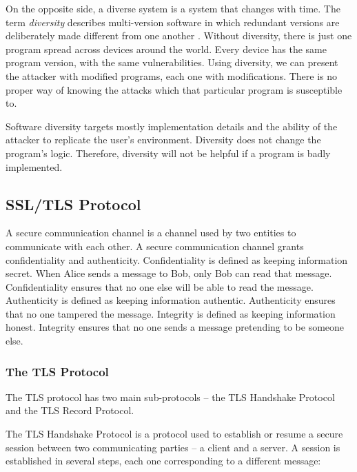 \documentclass{sig-alternate-05-2015}
\begin{document}
On the opposite side, a diverse system is a system that changes with time.
The term \textit{diversity} describes multi-version software in which redundant versions are deliberately made different from one another \cite{Littlewood2004}.
Without diversity, there is just one program spread across devices around the world. Every device has the same program version, with the same vulnerabilities. Using diversity, we can present the attacker with modified programs, each one with modifications. There is no proper way of knowing the attacks which that particular program is susceptible to.

Software diversity targets mostly implementation details and the ability of the attacker to replicate the user's environment. Diversity does not change the program's logic. Therefore, diversity will not be helpful if a program is badly implemented.

\subsection{SSL/TLS Protocol}

A secure communication channel is a channel used by two entities to communicate with each other. A secure communication channel grants confidentiality and authenticity. Confidentiality is defined as keeping information secret. When Alice sends a message to Bob, only Bob can read that message. Confidentiality ensures that no one else will be able to read the message. Authenticity is defined as keeping information authentic. Authenticity ensures that no one tampered the message. Integrity is defined as keeping information honest. Integrity ensures that no one sends a message pretending to be someone else.

\subsubsection{The TLS Protocol}

The TLS protocol has two main sub-protocols -- the TLS Handshake Protocol and the TLS Record Protocol.

The TLS Handshake Protocol is a protocol used to establish or resume a secure session between two communicating parties -- a client and a server.
A session is established in several steps, each one corresponding to a different message:
\end{document}
